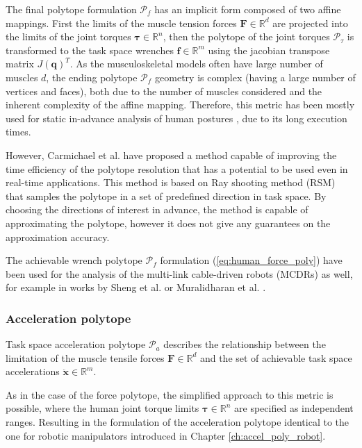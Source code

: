 The final polytope formulation $\mathcal{P}_f$ has an implicit form composed of two affine mappings. First the limits of the muscle tension forces $\bm{F}\in \mathbb{R}^d$ are projected into the limits of the joint torques $\bm{\tau}\in \mathbb{R}^n$, then the polytope of the joint torques $\mathcal{P}_\tau$ is transformed to the task space wrenches $\bm{f}\in \mathbb{R}^m$ using the jacobian transpose matrix $J(\bm{q})^T$. As the musculoskeletal models often have large number of muscles $d$, the ending polytope $\mathcal{P}_f$ geometry is complex (having a large number of vertices and faces), both due to the number of muscles considered and the inherent complexity of the affine mapping. Therefore, this metric has been mostly used for static in-advance analysis of human postures \cite{hernandez_toward_2015}, due to its long execution times. 

However, Carmichael et al. \cite{carmichael_estimating_2013, carmichael2011Towards} have proposed a method capable of improving the time efficiency of the polytope resolution that has a potential to be used even in real-time applications. This method is based on Ray shooting method (RSM) that samples the polytope in a set of predefined direction in task space. By choosing the directions of interest in advance, the method is capable of approximating the polytope, however it does not give any guarantees on the approximation accuracy.

The achievable wrench polytope $\mathcal{P}_f$ formulation (\ref{eq:human_force_poly}) have been used for the analysis of the multi-link cable-driven robots (MCDRs) as well, for example in works by Sheng et al. \cite{sheng2020operational} or Muralidharan et al. \cite{Muralidharan2022}.

\subsubsection{Acceleration polytope}
\label{ch:human_aceleration_poly}

Task space acceleration polytope $\mathcal{P}_a$ describes the relationship between the limitation of the muscle tensile forces $\bm{F}\in \mathbb{R}^d$ and the set of achievable task space accelerations $\ddot{\bm{x}}\in\mathbb{R}^m$.

As in the case of the force polytope, the simplified approach to this metric is possible, where the human joint torque limits $\bm{\tau}\in\mathbb{R}^n$ are specified as independent ranges. Resulting in the formulation of the acceleration polytope identical to the one for robotic manipulators introduced in Chapter \ref{ch:accel_poly_robot}. 

